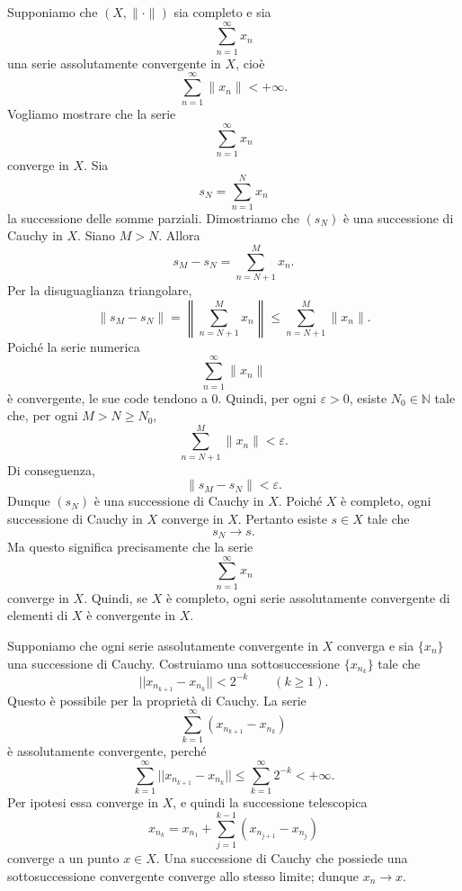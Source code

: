 \documentclass[a4paper]{article}
\begin{document}
\begin{radioactive}
\begin{snippetproof}{}
    \begin{iffproof}
    \item Supponiamo che \((X,\|\cdot\|)\) sia completo e sia
        \[
            \sum_{n=1}^{\infty} x_n
        \]
        una serie assolutamente convergente in \(X\), cioè
        \[
            \sum_{n=1}^{\infty} \|x_n\| < +\infty.
        \]
        Vogliamo mostrare che la serie
        \[
            \sum_{n=1}^{\infty} x_n
        \]
        converge in \(X\).
        Sia
        \[
            s_N = \sum_{n=1}^{N} x_n
        \]
        la successione delle somme parziali. Dimostriamo che \((s_N)\) è una successione di Cauchy in \(X\).
        Siano \(M > N\). Allora
        \[
            s_M - s_N = \sum_{n=N+1}^{M} x_n.
        \]
        Per la disuguaglianza triangolare,
        \[
            \|s_M - s_N\|
            =
            \left\|\sum_{n=N+1}^{M} x_n\right\|
            \leq
            \sum_{n=N+1}^{M} \|x_n\|.
        \]
        Poiché la serie numerica
        \[
            \sum_{n=1}^{\infty} \|x_n\|
        \]
        è convergente, le sue code tendono a \(0\). Quindi, per ogni \(\varepsilon > 0\), esiste \(N_0 \in \mathbb{N}\) tale che, per ogni \(M > N \geq N_0\),
        \[
            \sum_{n=N+1}^{M} \|x_n\| < \varepsilon.
        \]
        Di conseguenza,
        \[
            \|s_M - s_N\| < \varepsilon.
        \]
        Dunque \((s_N)\) è una successione di Cauchy in \(X\).
        Poiché \(X\) è completo, ogni successione di Cauchy in \(X\) converge in \(X\). Pertanto esiste \(s \in X\) tale che
        \[
            s_N \to s.
        \]
        Ma questo significa precisamente che la serie
        \[
            \sum_{n=1}^{\infty} x_n
        \]
        converge in \(X\).
        Quindi, se \(X\) è completo, ogni serie assolutamente convergente di elementi di \(X\) è convergente in \(X\).
    \item Supponiamo che ogni serie assolutamente convergente in \(X\) converga e sia
        \(\{x_n\}\) una successione di Cauchy. Costruiamo una sottosuccessione
        \(\{x_{n_k}\}\) tale che
        \[
            ||x_{n_{k+1}}-x_{n_k}||<2^{-k}
            \qquad(k\geq1).
        \]
        Questo è possibile per la proprietà di Cauchy. La serie
        \[
            \sum_{k=1}^{\infty}(x_{n_{k+1}}-x_{n_k})
        \]
        è assolutamente convergente, perché
        \[
            \sum_{k=1}^{\infty}||x_{n_{k+1}}-x_{n_k}||
            \leq\sum_{k=1}^{\infty}2^{-k}<+\infty.
        \]
        Per ipotesi essa converge in \(X\), e quindi la successione telescopica
        \[
            x_{n_k}=x_{n_1}+\sum_{j=1}^{k-1}(x_{n_{j+1}}-x_{n_j})
        \]
        converge a un punto \(x\in X\). Una successione di Cauchy che possiede una
        sottosuccessione convergente converge allo stesso limite; dunque \(x_n\to x\).
    \end{iffproof}
\end{snippetproof}
\end{radioactive}
\end{document}
